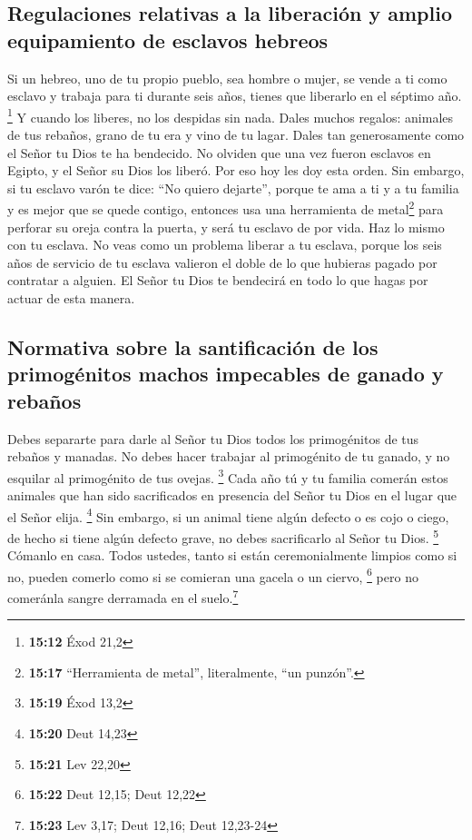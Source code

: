 \hypertarget{regulaciones-relativas-a-la-liberaciuxf3n-y-amplio-equipamiento-de-esclavos-hebreos}{%
\subsection{Regulaciones relativas a la liberación y amplio equipamiento
de esclavos
hebreos}\label{regulaciones-relativas-a-la-liberaciuxf3n-y-amplio-equipamiento-de-esclavos-hebreos}}

 Si un hebreo, uno de tu propio pueblo, sea hombre o
mujer, se vende a ti como esclavo y trabaja para ti durante seis años,
tienes que liberarlo en el séptimo año. \footnote{\textbf{15:12} Éxod
  21,2}  Y cuando los liberes, no los despidas sin nada.
 Dales muchos regalos: animales de tus rebaños, grano de
tu era y vino de tu lagar. Dales tan generosamente como el Señor tu Dios
te ha bendecido.  No olviden que una vez fueron esclavos
en Egipto, y el Señor su Dios los liberó. Por eso hoy les doy esta
orden.  Sin embargo, si tu esclavo varón te dice: ``No
quiero dejarte'', porque te ama a ti y a tu familia y es mejor que se
quede contigo,  entonces usa una herramienta de
metal\footnote{\textbf{15:17} ``Herramienta de metal'', literalmente,
  ``un punzón''.} para perforar su oreja contra la puerta, y será tu
esclavo de por vida. Haz lo mismo con tu esclava.  No
veas como un problema liberar a tu esclava, porque los seis años de
servicio de tu esclava valieron el doble de lo que hubieras pagado por
contratar a alguien. El Señor tu Dios te bendecirá en todo lo que hagas
por actuar de esta manera.

\hypertarget{normativa-sobre-la-santificaciuxf3n-de-los-primoguxe9nitos-machos-impecables-de-ganado-y-rebauxf1os}{%
\subsection{Normativa sobre la santificación de los primogénitos machos
impecables de ganado y
rebaños}\label{normativa-sobre-la-santificaciuxf3n-de-los-primoguxe9nitos-machos-impecables-de-ganado-y-rebauxf1os}}

 Debes separarte para darle al Señor tu Dios todos los
primogénitos de tus rebaños y manadas. No debes hacer trabajar al
primogénito de tu ganado, y no esquilar al primogénito de tus ovejas.
\footnote{\textbf{15:19} Éxod 13,2}  Cada año tú y tu
familia comerán estos animales que han sido sacrificados en presencia
del Señor tu Dios en el lugar que el Señor elija. \footnote{\textbf{15:20}
  Deut 14,23}  Sin embargo, si un animal tiene algún
defecto o es cojo o ciego, de hecho si tiene algún defecto grave, no
debes sacrificarlo al Señor tu Dios. \footnote{\textbf{15:21} Lev 22,20}
 Cómanlo en casa. Todos ustedes, tanto si están
ceremonialmente limpios como si no, pueden comerlo como si se comieran
una gacela o un ciervo, \footnote{\textbf{15:22} Deut 12,15; Deut 12,22}
 pero no comeránla sangre derramada en el
suelo.\footnote{\textbf{15:23} Lev 3,17; Deut 12,16; Deut 12,23-24}

